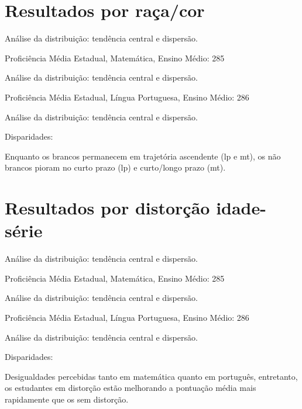 \documentclass[
  ignorenonframetext,
]{beamer}
\begin{document}
\hypertarget{resultados-por-rauxe7acor}{%
\section{Resultados por raça/cor}\label{resultados-por-rauxe7acor}}

\begin{frame}
Análise da distribuição: tendência central e dispersão.

Proficiência Média Estadual, Matemática, Ensino Médio: 285
\end{frame}

\begin{frame}
Análise da distribuição: tendência central e dispersão.

Proficiência Média Estadual, Língua Portuguesa, Ensino Médio: 286
\end{frame}

\begin{frame}
Análise da distribuição: tendência central e dispersão.

Disparidades:

Enquanto os brancos permanecem em trajetória ascendente (lp e mt), os
não brancos pioram no curto prazo (lp) e curto/longo prazo (mt).
\end{frame}

\hypertarget{resultados-por-distoruxe7uxe3o-idade-suxe9rie}{%
\section{Resultados por distorção
idade-série}\label{resultados-por-distoruxe7uxe3o-idade-suxe9rie}}

\begin{frame}
Análise da distribuição: tendência central e dispersão.

Proficiência Média Estadual, Matemática, Ensino Médio: 285
\end{frame}

\begin{frame}
Análise da distribuição: tendência central e dispersão.

Proficiência Média Estadual, Língua Portuguesa, Ensino Médio: 286
\end{frame}

\begin{frame}
Análise da distribuição: tendência central e dispersão.

Disparidades:

Desigualdades percebidas tanto em matemática quanto em português,
entretanto, os estudantes em distorção estão melhorando a pontuação
média mais rapidamente que os sem distorção.
\end{frame}
\end{document}
